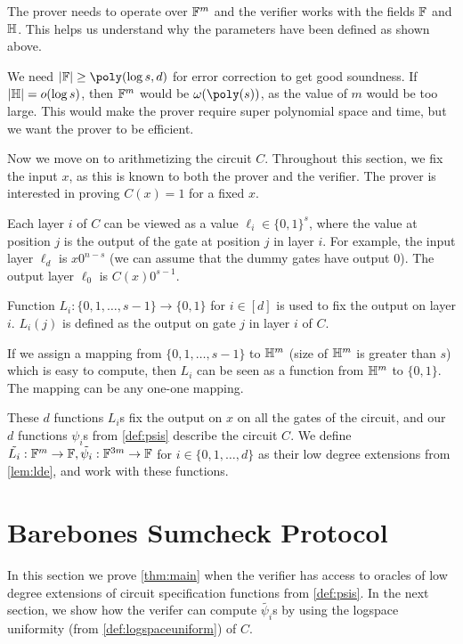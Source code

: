 The prover needs to operate over $\mathbb{F}^m$ and the verifier works with the fields
$\mathbb{F}$ and $\mathbb{H}$. This helps us understand why the parameters have been defined
as shown above.

We need $|\F| \geq \poly(\log s, d)$ for error correction to get good
soundness. If $|\mathbb{H}| = o(\log s)$, then $\mathbb{F}^m$ would be $\omega(\poly(s))$, as
the value of $m$ would be too large. This would make the prover require super
polynomial space and time, but we want the prover to be efficient.

Now we move on to arithmetizing the circuit $C$. Throughout this section, we
fix the input $x$, as this is known to both the prover and the verifier. The
prover is interested in proving $C(x)=1$ for a fixed $x$.

Each layer $i$ of $C$ can be viewed as a value $\ell_i \in \{0,1\}^{s}$, where
the value at position $j$ is the output of the gate at position $j$ in layer
$i$. For example, the input layer $\ell_d$ is $x0^{n-s}$ (we can assume that
the dummy gates have output 0). The output layer $\ell_0$ is $C(x)0^{s-1}$.

Function $L_i:\{0,1, \ldots, s-1\} \rightarrow \{0,1\}$ for $i \in [d]$ is used
to fix the output on layer $i$. $L_i(j)$ is defined as the output on gate $j$
in layer $i$ of $C$.

If we assign a mapping from $\{0,1, \ldots, s-1\}$ to $\mathbb{H}^m$ (size of $\mathbb{H}^m$
is greater than $s$) which is easy to compute, then $L_i$ can be seen as a
function from $\mathbb{H}^m$ to $\{0,1\}$. The mapping can be any one-one mapping.

These $d$ functions $L_i$s fix the output on $x$ on all the gates of the
circuit, and our $d$ functions $\psi_i$s from \cref{def:psis} describe the
circuit $C$. We define $\tilde{L_i}: \mathbb{F}^m \rightarrow \mathbb{F}, \tilde{\psi_i}:
\mathbb{F}^{3m} \rightarrow \mathbb{F}$ for $i\in \{0,1,\ldots, d\}$ as their low degree
extensions from \cref{lem:lde}, and work with these functions.

\section{Barebones Sumcheck Protocol}

In this section we prove \cref{thm:main} when the verifier has access to
oracles of low degree extensions of circuit specification functions from
\cref{def:psis}. In the next section, we show how the verifer can compute
$\tilde{\psi_i}$s by using the logspace uniformity (from
\cref{def:logspaceuniform}) of $C$.

